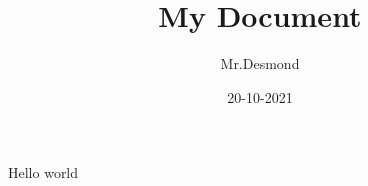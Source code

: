 \documentclass{article}
\title{My Document}
\date{20-10-2021}
\author{Mr.Desmond}
\begin{document}
\maketitle
\newpage
{}
Hello world
\end{document}
